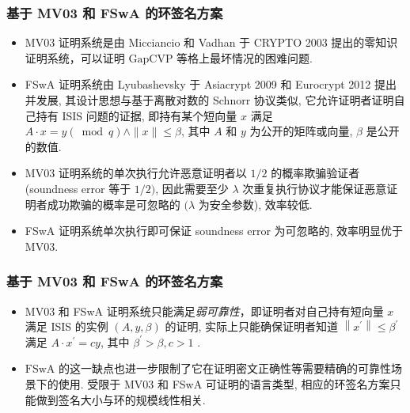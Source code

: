 \documentclass{beamer}
\begin{document}
        \begin{frame}
            \frametitle{基于 MV03 和 FSwA 的环签名方案}
        
            \begin{itemize}
                \item MV03 证明系统是由 Micciancio 和 Vadhan 于 CRYPTO 2003 提出的零知识证明系统，可以证明 $\mathrm{GapCVP}$ 等格上最坏情况的困难问题. 
                \item FSwA 证明系统由 Lyubashevsky 于 Asiacrypt 2009 和 Eurocrypt 2012 提出并发展, 其设计思想与基于离散对数的 Schnorr 协议类似, 它允许证明者证明自己持有 ISIS 问题的证据, 即持有某个短向量 $x$ 满足 $A \cdot x=y(\bmod q) \wedge\|x\| \leq \beta$, 其中 $A$ 和 $y$ 为公开的矩阵或向量, $\beta$ 是公开的数值. 
                \item MV03 证明系统的单次执行允许恶意证明者以 $1 / 2$ 的概率欺骗验证者 (soundness error 等于 $1 / 2)$, 因此需要至少 $\lambda$ 次重复执行协议才能保证恶意证明者成功欺骗的概率是可忽略的 $(\lambda$ 为安全参数), 效率较低. 
                \item FSwA 证明系统单次执行即可保证 soundness error 为可忽略的, 效率明显优于 MV03.
            \end{itemize}
        
        \end{frame}

        \begin{frame}
            \frametitle{基于 MV03 和 FSwA 的环签名方案}
            \begin{itemize}
                \item MV03 和 FSwA 证明系统只能满足\emph{弱可靠性}，即证明者对自己持有短向量 $x$ 满足 ISIS 的实例 $(A, y, \beta)$ 的证明, 实际上只能确保证明者知道 $\left\|x^{\prime}\right\| \leq \beta^{\prime}$ 满足 $A \cdot x^{\prime}=c y$, 其中 $\beta^{\prime}>\beta,c>1$ . 
                \item $\mathrm{FSwA}$ 的这一缺点也进一步限制了它在证明密文正确性等需要精确的可靠性场景下的使用. 受限于 MV03 和 FSwA 可证明的语言类型, 相应的环签名方案只能做到签名大小与环的规模线性相关.
            \end{itemize}
        
            
        
        \end{frame}
\end{document}
